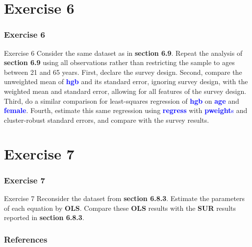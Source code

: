 \documentclass[11pt, aspectratio=169]{beamer}
\begin{document}
	\section{Exercise 6}
		\begin{frame}
			\frametitle{Exercise 6}
			\begin{block}{Exercise 6}
				Consider the same dataset as in \textcolor{red!50}{\textbf{section 6.9}}. Repeat the analysis of
				\textcolor{red!50}{\textbf{section 6.9}} using all observations rather than restricting the sample to
				ages between 21 and 65 years. First, declare the survey design.
				Second, compare the unweighted mean of \textcolor{blue}{\textbf{hgb}} and its standard error,
				ignoring survey design, with the weighted mean and standard error,
				allowing for all features of the survey design. Third, do a similar
				comparison for least-squares regression of \textcolor{blue}{\textbf{hgb}} on \textcolor{blue}{\textbf{age}} and \textcolor{blue}{\textbf{female}}.
				Fourth, estimate this same regression using \textcolor{blue}{\textbf{regress}} with \textcolor{blue}{\textbf{pweight}s}
				and cluster-robust standard errors, and compare with the survey
				results.
			\end{block}
		\end{frame}
	\section{Exercise 7}
		\begin{frame}
			\frametitle{Exercise 7}
			\begin{block}{Exercise 7}
				Reconsider the dataset from \textcolor{red!50}{\textbf{section 6.8.3}}. Estimate the parameters of
				each equation by \textbf{OLS}. Compare these \textbf{OLS} results with the \textbf{SUR} results
				reported in \textcolor{red!50}{\textbf{section 6.8.3}}.
			\end{block}
		\end{frame}
	\begin{frame}[t,allowframebreaks]
		\frametitle{References}
		
		
		\nocite{cameron2022-I}
		\nocite{cameron2022-II}
	\end{frame}
	\begin{frame}
		\maketitle
	\end{frame}
\end{document}
